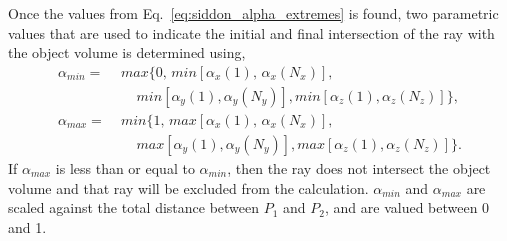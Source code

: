 Once the values from Eq.~\ref{eq:siddon_alpha_extremes} is found, two parametric values that are used to indicate the initial and final intersection of the ray with the object volume is determined using,
%
\begin{equation}
\begin{aligned}
\alpha_{min} = \; & max\{ 0, \, min \left[ \alpha_x(1), \, \alpha_x(N_x) \right], \\
               & \; \; \; \; min \left[ \alpha_y(1), \alpha_y(N_y) \right], min \left[ \alpha_z(1), \alpha_z (N_z) \right] \}, \\
\alpha_{max} = \; & min\{1, \, max \left[ \alpha_x(1), \, \alpha_x(N_x) \right], \\
			   & \; \; \; \; max \left[ \alpha_y(1), \alpha_y(N_y) \right], max \left[ \alpha_z(1), \alpha_z (N_z) \right] \}.
\end{aligned}
\label{eq:siddon_alpha_min_max}
\end{equation}
%
If $\alpha_{max}$ is less than or equal to $\alpha_{min}$, then the ray does not intersect the object volume and that ray will be excluded from the calculation.  $\alpha_{min}$ and $\alpha_{max}$ are scaled against the total distance between $P_1$ and $P_2$, and are valued between 0 and 1.

